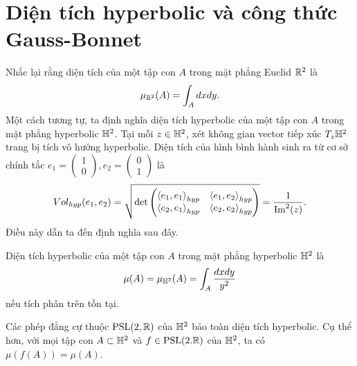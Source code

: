 \section{Diện tích hyperbolic và công thức Gauss-Bonnet}
Nhắc lại rằng diện tích của một tập con $A$ trong mặt phẳng Euclid $\mathbb{R}^2$ là 
\[\mu_{\mathbb{R}^2}(A) = \int_Adxdy.\]
Một cách tương tự, ta định nghĩa diện tích hyperbolic của một tập con $A$ trong mặt phẳng hyperbolic $\mathbb{H}^2$. Tại mỗi $z\in \mathbb{H}^2$, xét không gian vector tiếp xúc $T_z\mathbb{H}^2$ trang bị tích vô hướng hyperbolic. Diện tích của hình bình hành sinh ra từ cơ sở chính tắc $e_1 = \begin{pmatrix}
    1\\0
\end{pmatrix},e_2 = \begin{pmatrix}
    0\\1
\end{pmatrix}$ là 
\[Vol_{hyp}(e_1,e_2) = \sqrt{\det\begin{pmatrix}
    \left<e_1,e_1\right>_{hyp} & \left<e_1,e_2\right>_{hyp}\\
    \left<e_2,e_1\right>_{hyp} & \left<e_2,e_2\right>_{hyp}
\end{pmatrix}} = \dfrac{1}{\operatorname{Im}^2(z)}.\]
Điều này dẫn ta đến định nghĩa sau đây.
\begin{defn}
Diện tích hyperbolic của một tập con $A$ trong mặt phẳng hyperbolic $\mathbb{H}^2$ là
\[\mu(A) = \mu_{\mathbb{H}^2}(A) = \int_A\dfrac{dxdy}{y^2}\] 
nếu tích phân trên tồn tại.
\end{defn}

\begin{thm}
    Các phép đẳng cự thuộc $\operatorname{PSL}(2,\mathbb{R})$ của $\mathbb{H}^2$ bảo toàn diện tích hyperbolic. Cụ thể hơn, với mọi tập con $A \subset \mathbb{H}^2$ và $f \in \operatorname{PSL}(2.\mathbb{R})$ của $\mathbb{H}^2$, ta có $\mu(f(A)) = \mu(A)$.
\end{thm}

